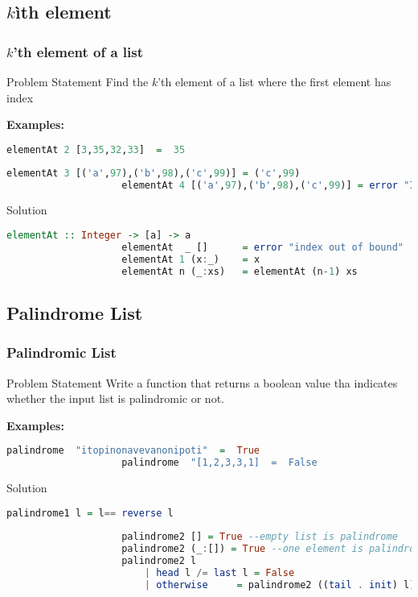 \subsection{$k$ìth element}
\begin{frame}[fragile]\frametitle{$k$'th element of a list}


\begin{block}{Problem Statement}
			Find the $k$'th element of a list where the first element has index
\end{block}	
\textbf{Examples:}
		\begin{lstlisting}[language=Haskell,basicstyle=\footnotesize\ttfamily]
					elementAt 2 [3,35,32,33]  =  35 
		\end{lstlisting}
		\pause
		\begin{lstlisting}[language=Haskell,basicstyle=\footnotesize\ttfamily]
					elementAt 3 [('a',97),('b',98),('c',99)] = ('c',99)
					elementAt 4 [('a',97),('b',98),('c',99)] = error "Index out of bound" 
		\end{lstlisting}
					
\pause \pause
\begin{alertblock}{Solution}
			\begin{lstlisting}[language=Haskell]
					elementAt :: Integer -> [a] -> a
					elementAt  _ [] 	 = error "index out of bound"
					elementAt 1 (x:_)	 = x
					elementAt n (_:xs)   = elementAt (n-1) xs 
		\end{lstlisting}
\end{alertblock}	

\end{frame}


\subsection{Palindrome List}
\begin{frame}[fragile]\frametitle{Palindromic List}


\begin{block}{Problem Statement}
			Write a function that returns a boolean value tha indicates whether the input
			list is palindromic or not.
\end{block} \pause	
\textbf{Examples:}
		\begin{lstlisting}[language=Haskell,basicstyle=\footnotesize\ttfamily]
					palindrome  "itopinonavevanonipoti"  =  True
					palindrome  "[1,2,3,3,1]  =  False
		\end{lstlisting}
\pause
\begin{alertblock}{Solution}
			\begin{lstlisting}[language=Haskell,basicstyle=\footnotesize\ttfamily]
					palindrome1 l = l== reverse l
					
					palindrome2 [] = True --empty list is palindrome
					palindrome2 (_:[]) = True --one element is palindrome
					palindrome2 l 
    					| head l /= last l = False
    					| otherwise 	= palindrome2 ((tail . init) l)
					
		\end{lstlisting}
\end{alertblock}	

\end{frame}
